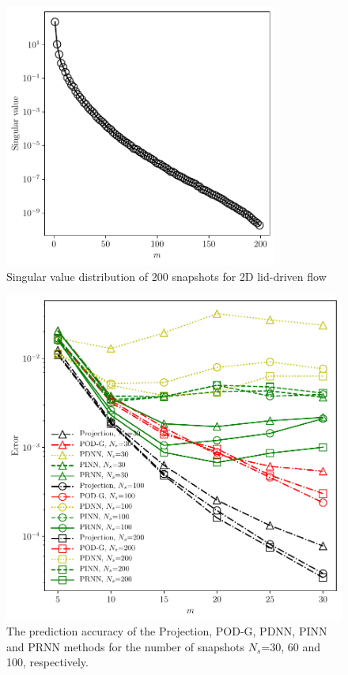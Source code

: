 \documentclass[preprint, 10pt]{elsarticle}
\begin{document}
\begin{figure}[!ht]
  \centering
  \includegraphics[width=9cm]{../../pythonNN/2DNaturalConvection/fig/SingularValues_200.pdf}
\caption{Singular value distribution of 200 snapshots for 2D lid-driven flow}
\label{fig_2DNaturalConvectionSingularValues}
\end{figure}

\begin{figure}[!ht]
  \centering
  \includegraphics[width=12cm]{../../pythonNN/2DNaturalConvection/fig/ErrorComparsion_SampleNum.pdf}
\caption{The prediction accuracy of the Projection, POD-G, PDNN, PINN and PRNN methods for the number of snapshots $N_s$=30, 60 and 100, respectively.}
\label{fig_2DNaturalConvectionErrorComparsion_SampleNum}
\end{figure}
\end{document}

